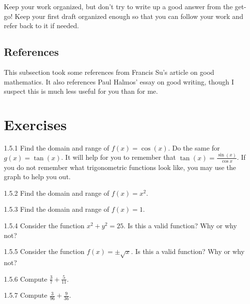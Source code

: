 Keep your work organized, but don't try to write up a good answer from the get-go! Keep your first draft organized enough so that you can follow your work and refer back to it if needed.

\subsection{References}

This subsection took some references from Francis Su's \cite{su:2015} article on good mathematics. It also references Paul Halmos' \cite{halmos} essay on good writing, though I suspect this is much less useful for you than for me. 

\section{Exercises}

\begin{exercise}{1.5.1}
Find the domain and range of $f(x) = \cos(x)$. Do the same for $g(x) = \tan(x)$. It will help for you to remember that $\tan(x) = \frac{\sin(x)}{\cos{x}}$. If you do not remember what trigonometric functions look like, you may use the graph to help you out. 
\end{exercise}

\begin{exercise}{1.5.2}
Find the domain and range of $f(x) = x^2$.
\end{exercise}

\begin{exercise}{1.5.3}
Find the domain and range of $f(x) = 1$.
\end{exercise}

\begin{exercise}{1.5.4}
Consider the function $x^2 + y^2 = 25$. Is this a valid function? Why or why not?
\end{exercise}

\begin{exercise}{1.5.5}
Consider the function $f(x) = \pm\sqrt{x}$. Is this a valid function? Why or why not? 
\end{exercise}

\begin{exercise}{1.5.6}
Compute $\frac{3}{7} + \frac{5}{11}$.
\end{exercise}

\begin{exercise}{1.5.7}
Compute $\frac{3}{96} + \frac{9}{36}$. 
\end{exercise}

